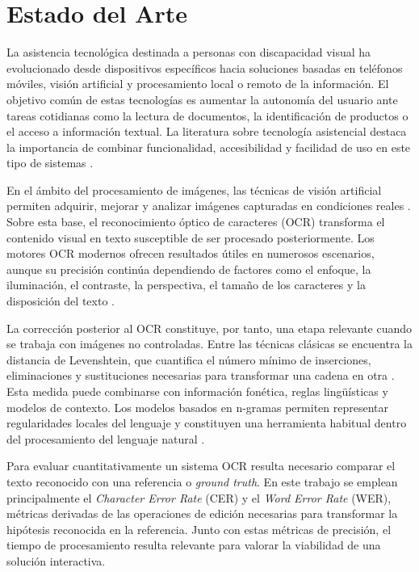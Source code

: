 
\chapter{Estado del Arte}

La asistencia tecnológica destinada a personas con discapacidad visual ha evolucionado desde dispositivos específicos hacia soluciones basadas en teléfonos móviles, visión artificial y procesamiento local o remoto de la información. El objetivo común de estas tecnologías es aumentar la autonomía del usuario ante tareas cotidianas como la lectura de documentos, la identificación de productos o el acceso a información textual. La literatura sobre tecnología asistencial destaca la importancia de combinar funcionalidad, accesibilidad y facilidad de uso en este tipo de sistemas \cite{assistive}.

En el ámbito del procesamiento de imágenes, las técnicas de visión artificial permiten adquirir, mejorar y analizar imágenes capturadas en condiciones reales \cite{gonzalez,mobilevision}. Sobre esta base, el reconocimiento óptico de caracteres (OCR) transforma el contenido visual en texto susceptible de ser procesado posteriormente. Los motores OCR modernos ofrecen resultados útiles en numerosos escenarios, aunque su precisión continúa dependiendo de factores como el enfoque, la iluminación, el contraste, la perspectiva, el tamaño de los caracteres y la disposición del texto \cite{ocr}.

La corrección posterior al OCR constituye, por tanto, una etapa relevante cuando se trabaja con imágenes no controladas. Entre las técnicas clásicas se encuentra la distancia de Levenshtein, que cuantifica el número mínimo de inserciones, eliminaciones y sustituciones necesarias para transformar una cadena en otra \cite{levenshtein}. Esta medida puede combinarse con información fonética, reglas lingüísticas y modelos de contexto. Los modelos basados en n-gramas permiten representar regularidades locales del lenguaje y constituyen una herramienta habitual dentro del procesamiento del lenguaje natural \cite{nlp}.

Para evaluar cuantitativamente un sistema OCR resulta necesario comparar el texto reconocido con una referencia o \textit{ground truth}. En este trabajo se emplean principalmente el \textit{Character Error Rate} (CER) y el \textit{Word Error Rate} (WER), métricas derivadas de las operaciones de edición necesarias para transformar la hipótesis reconocida en la referencia. Junto con estas métricas de precisión, el tiempo de procesamiento resulta relevante para valorar la viabilidad de una solución interactiva.


